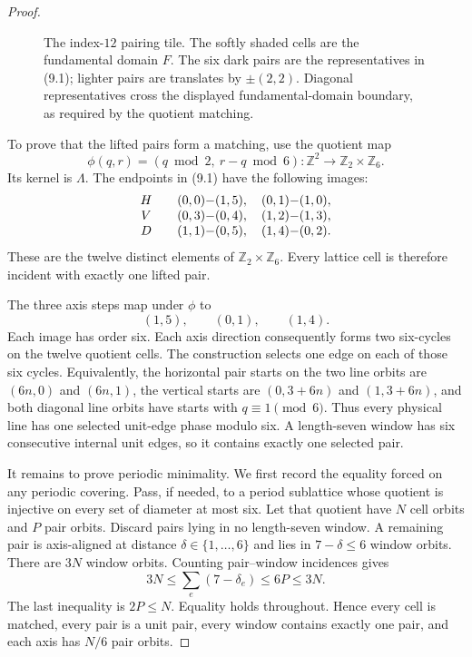 \begin{proof}
\begin{figure}[tb]
\caption{The index-$12$ pairing tile.  The softly shaded cells are the
fundamental domain $F$.  The six dark pairs are the representatives in
\textup{(9.1)}; lighter pairs are translates by $\pm(2,2)$.  Diagonal
representatives cross the displayed fundamental-domain boundary, as required
by the quotient matching.}
\label{fig:pairing-tile}
\end{figure}

To prove that the lifted pairs form a matching, use the quotient map
\[
 \phi(q,r)=(q\bmod2,\ r-q\bmod6)
 \colon\mathbb Z^2\longrightarrow\mathbb Z_2\times\mathbb Z_6.
\]
Its kernel is $\Lambda$.  The endpoints in (9.1) have the following images:
\[
\begin{array}{c@{\qquad}l}
H &(0,0){-}(1,5),\quad (0,1){-}(1,0),\\
V &(0,3){-}(0,4),\quad (1,2){-}(1,3),\\
D &(1,1){-}(0,5),\quad (1,4){-}(0,2).
\end{array}
\]
These are the twelve distinct elements of
$\mathbb Z_2\times\mathbb Z_6$.  Every lattice cell is therefore incident
with exactly one lifted pair.

The three axis steps map under $\phi$ to
\[
 (1,5),\qquad(0,1),\qquad(1,4).
\]
Each image has order six.  Each axis direction consequently forms two
six-cycles on the twelve quotient cells.  The construction selects one edge
on each of those six cycles.  Equivalently, the horizontal pair starts on the
two line orbits are $(6n,0)$ and $(6n,1)$, the vertical starts are
$(0,3+6n)$ and $(1,3+6n)$, and both diagonal line orbits have starts with
$q\equiv1\pmod6$.  Thus every physical line has one selected unit-edge phase
modulo six.  A length-seven window has six consecutive internal unit edges,
so it contains exactly one selected pair.

It remains to prove periodic minimality.  We first record the equality forced
on any periodic covering.  Pass, if needed, to a period sublattice whose
quotient is injective on every set of diameter at most six.  Let that quotient
have $N$ cell orbits and $P$ pair orbits.  Discard pairs lying in no
length-seven window.  A remaining pair is axis-aligned at distance
$\delta\in\{1,\ldots,6\}$ and lies in $7-\delta\leq6$ window orbits.  There
are $3N$ window orbits.  Counting pair--window incidences gives
\[
 3N\leq\sum_e(7-\delta_e)\leq6P\leq3N.
\tag{9.2}
\]
The last inequality is $2P\leq N$.  Equality holds throughout.  Hence every
cell is matched, every pair is a unit pair, every window contains exactly one
pair, and each axis has $N/6$ pair orbits.


\end{proof}
